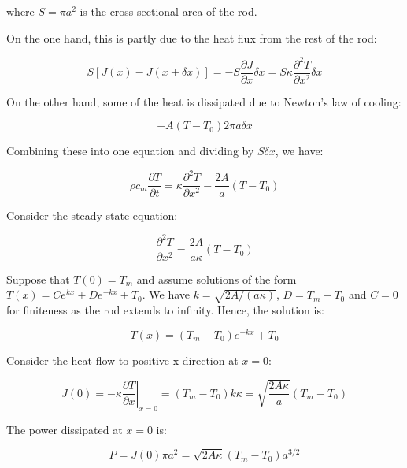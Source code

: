 \documentclass[12pt]{article}
\begin{document}
where $S = \pi a^{2}$ is the cross-sectional area of the rod.

On the one hand, this is partly due to the heat flux from the rest of the rod:

\begin{equation}
    S[J(x) - J(x + \delta x)] = -S \frac{\partial J}{\partial x} \delta x = S\kappa \frac{\partial^{2} T}{\partial x^{2}} \delta x
\end{equation}

On the other hand, some of the heat is dissipated due to Newton's law of cooling:

\begin{equation}
    -A(T - T_{0}) 2\pi a \delta x
\end{equation}

Combining these into one equation and dividing by $S \delta x$, we have:

\begin{equation}
    \rho c_{m} \frac{\partial T}{\partial t} = \kappa \frac{\partial^{2} T}{\partial x^{2}} - \frac{2A}{a} (T - T_{0})
\end{equation}

Consider the steady state equation:

\begin{equation}
    \frac{\partial^{2} T}{\partial x^{2}} = \frac{2A}{a\kappa} (T - T_{0})
\end{equation}

Suppose that $T(0) = T_{m}$ and assume solutions of the form $T(x) = C e^{kx} + D e^{-kx} + T_{0}$. We have $k = \sqrt{2A/(a\kappa)}$, $D = T_{m} - T_{0}$ and $C = 0$ for finiteness as the rod extends to infinity. Hence, the solution is:

\begin{equation}
    T(x) = (T_{m} - T_{0}) e^{-kx} + T_{0}
\end{equation}

Consider the heat flow to positive x-direction at $x = 0$:

\begin{equation}
    J(0) = -\kappa \left. \frac{\partial T}{\partial x} \right|_{x = 0} = (T_{m} - T_{0}) k\kappa = \sqrt{\frac{2A\kappa}{a}} (T_{m} - T_{0})
\end{equation}

The power dissipated at $x = 0$ is:

\begin{equation}
    P = J(0) \pi a^{2} = \sqrt{2A\kappa} (T_{m} - T_{0}) a^{3/2}
\end{equation}
\end{document}
